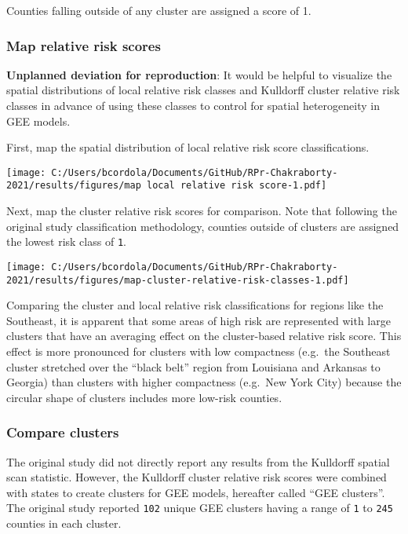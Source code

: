 \documentclass[
]{article}
\begin{document}
Counties falling outside of any cluster are assigned a score of 1.

\hypertarget{map-relative-risk-scores}{%
\subsubsection{Map relative risk
scores}\label{map-relative-risk-scores}}

\textbf{Unplanned deviation for reproduction}: It would be helpful to
visualize the spatial distributions of local relative risk classes and
Kulldorff cluster relative risk classes in advance of using these
classes to control for spatial heterogeneity in GEE models.

First, map the spatial distribution of local relative risk score
classifications.

\texttt{[image: C:/Users/bcordola/Documents/GitHub/RPr-Chakraborty-2021/results/figures/map local relative risk score-1.pdf]}

Next, map the cluster relative risk scores for comparison. Note that
following the original study classification methodology, counties
outside of clusters are assigned the lowest risk class of \texttt{1}.

\texttt{[image: C:/Users/bcordola/Documents/GitHub/RPr-Chakraborty-2021/results/figures/map-cluster-relative-risk-classes-1.pdf]}

Comparing the cluster and local relative risk classifications for
regions like the Southeast, it is apparent that some areas of high risk
are represented with large clusters that have an averaging effect on the
cluster-based relative risk score. This effect is more pronounced for
clusters with low compactness (e.g.~the Southeast cluster stretched over
the ``black belt'' region from Louisiana and Arkansas to Georgia) than
clusters with higher compactness (e.g.~New York City) because the
circular shape of clusters includes more low-risk counties.

\hypertarget{compare-clusters}{%
\subsubsection{Compare clusters}\label{compare-clusters}}

The original study did not directly report any results from the
Kulldorff spatial scan statistic. However, the Kulldorff cluster
relative risk scores were combined with states to create clusters for
GEE models, hereafter called ``GEE clusters''. The original study
reported \texttt{102} unique GEE clusters having a range of \texttt{1}
to \texttt{245} counties in each cluster.
\end{document}
